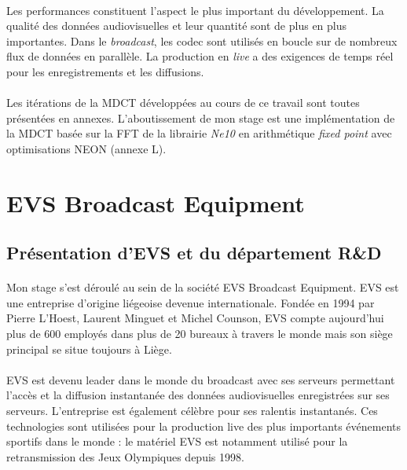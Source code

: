 \documentclass{article}
\begin{document}
    \paragraph{}
    Les performances constituent l'aspect le plus important du développement. La qualité des données audiovisuelles et leur quantité sont de plus en plus importantes. Dans le \emph{broadcast}, les codec sont utilisés en boucle sur de nombreux flux de données en parallèle. La production en \emph{live} a des exigences de temps réel pour les enregistrements et les diffusions.

    \paragraph{}
    Les itérations de la MDCT développées au cours de ce travail sont toutes présentées en annexes. L'aboutissement de mon stage est une implémentation de la MDCT basée sur la FFT de la librairie \emph{Ne10} en arithmétique \emph{fixed point} avec optimisations NEON (annexe L).



    \newpage
    \section{EVS Broadcast Equipment}
    \subsection{Présentation d'EVS et du département R\&D}
    \paragraph{}
    Mon stage s'est déroulé au sein de la société EVS Broadcast Equipment. EVS est une entreprise d'origine liégeoise devenue internationale. Fondée en 1994 par Pierre L'Hoest, Laurent Minguet et Michel Counson, EVS compte aujourd'hui plus de 600 employés dans plus de 20 bureaux à travers le monde mais son siège principal se situe toujours à Liège\cite{EVS:website}.

    \paragraph{}
    EVS est devenu leader dans le monde du broadcast avec ses serveurs permettant l'accès et la diffusion instantanée des données audiovisuelles enregistrées sur ses serveurs. L'entreprise est également célèbre pour ses ralentis instantanés. Ces technologies sont utilisées pour la production live des plus importants événements sportifs dans le monde : le matériel EVS est notamment utilisé pour la retransmission des Jeux Olympiques depuis 1998.
\end{document}
